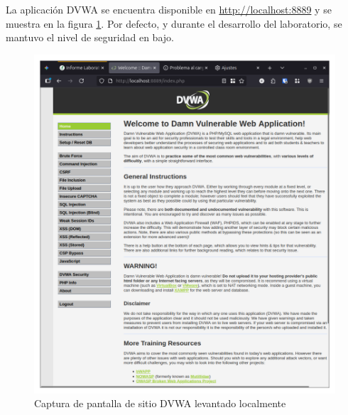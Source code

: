 \documentclass[letterpaper,12pt]{article}
\begin{document}
La aplicación DVWA se encuentra disponible en \url{http://localhost:8889} y se muestra en la figura \ref{fig:dvwastartscreen}. Por defecto, y durante el desarrollo del laboratorio, se mantuvo el nivel de seguridad en bajo.
\begin{figure}
    \centering
    \includegraphics[width=1\linewidth]{levanteyredireccione/Captura desde 2025-10-01 23-14-34.png}
    \caption{Captura de pantalla de sitio DVWA levantado localmente}
    \label{fig:dvwastartscreen}
\end{figure}
\end{document}
